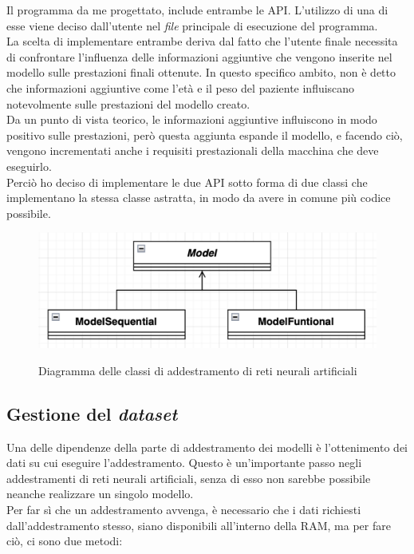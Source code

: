 Il programma da me progettato, include entrambe le API. L'utilizzo di una di esse viene deciso dall'utente nel \textit{file} principale di esecuzione del programma.\\
La scelta di implementare entrambe deriva dal fatto che l'utente finale necessita di confrontare l'influenza delle informazioni aggiuntive che vengono inserite nel modello sulle prestazioni finali ottenute. In questo specifico ambito, non è detto che informazioni aggiuntive come l'età e il peso del paziente influiscano notevolmente sulle prestazioni del modello creato.\\
Da un punto di vista teorico, le informazioni aggiuntive influiscono in modo positivo sulle prestazioni, però questa aggiunta espande il modello, e facendo ciò, vengono incrementati anche i requisiti prestazionali della macchina che deve eseguirlo.\\
Perciò ho deciso di implementare le due API sotto forma di due classi che implementano la stessa classe astratta, in modo da avere in comune più codice possibile.
\begin{figure}[H]
    \centering
    \includegraphics[alt={Diagramma delle classi di addestramento di reti neurali artificiali}, width=0.75\columnwidth]{img/model-diag.png}
    \caption{\centering Diagramma delle classi di addestramento di reti neurali artificiali}
    \label{fig:datasetgetter-diagram}
\end{figure}

\subsection{Gestione del \textit{dataset}}\noindent
Una delle dipendenze della parte di addestramento dei modelli è l'ottenimento dei dati su cui eseguire l'addestramento. Questo è un'importante passo negli addestramenti di reti neurali artificiali, senza di esso non sarebbe possibile neanche realizzare un singolo modello.\\
Per far sì che un addestramento avvenga, è necessario che i dati richiesti dall'addestramento stesso, siano disponibili all'interno della RAM, ma per fare ciò, ci sono due metodi:

